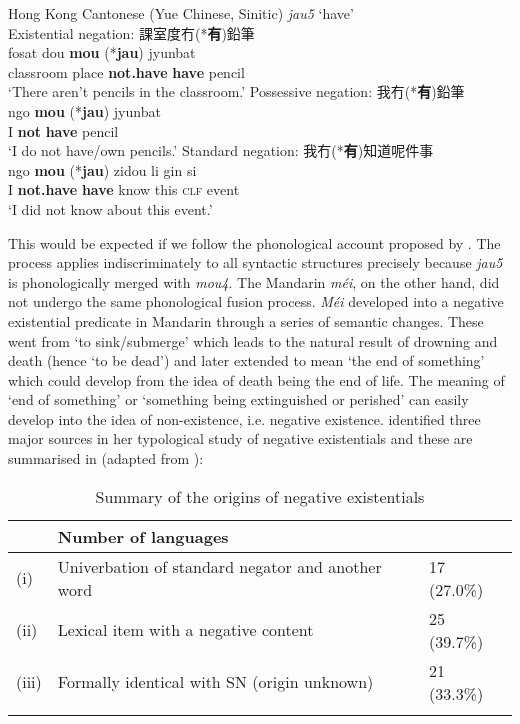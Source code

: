 \documentclass[output=paper,colorlinks,citecolor=brown,chinesefont]{langscibook}
\begin{document}
\newpage
\ea Hong Kong Cantonese (Yue Chinese, Sinitic) \textit{jau5} `have' \label{ex:lam32}\\
  \ea Existential negation: {\cn 課室度冇(*\textbf{有})鉛筆} \label{ex:lam32a}\\
  	\gll fosat dou \textbf{mou} (*\textbf{jau}) jyunbat\\
  	classroom	place	\textbf{not.have}	\textbf{have}	pencil\\
  	\glt `There aren't pencils in the classroom.'
  \ex Possessive negation: {\cn 我冇(*\textbf{有})鉛筆} \label{ex:lam32b}\\
  	\gll ngo	 \textbf{mou}	 (*\textbf{jau}) jyunbat\\
  	I \textbf{not} \textbf{have} pencil\\
  	\glt `I do not have/own pencils.'
  \ex Standard negation: {\cn 我冇(*\textbf{有})知道呢件事} \label{ex:lam32c}\\
  	\gll ngo	 \textbf{mou} (*\textbf{jau}) zidou li gin si\\
  	I \textbf{not.have} \textbf{have} know this	\textsc{clf}	event\\
  	\glt `I did not know about this event.'
\z \z

This would be expected if we follow the phonological account proposed by \citeauthor{Law2014}. The process applies indiscriminately to all syntactic structures precisely because \textit{jau5} is phonologically merged with \textit{mou4}. The Mandarin \textit{méi}, on the other hand, did not undergo the same phonological fusion process. \textit{Méi} developed into a negative existential predicate in Mandarin through a series of semantic changes. These went from `to sink/submerge' which leads to the natural result of drowning and death (hence `to be dead') and later extended to mean `the end of something' which could develop from the idea of death being the end of life. The meaning of `end of something' or `something being extinguished or perished' can easily develop into the idea of non-existence, i.e. negative existence. \citet{Veselinova2013} identified three major sources in her typological study of negative existentials and these are summarised in  (adapted from \citet[Table 7]{Veselinova2013}):

\begin{table}
  \begin{tabularx}{\textwidth}{llY}
    \lsptoprule
     & Number of languages\\
     \midrule
(i)	& Univerbation of standard negator and another word & 17 (27.0\%)\\
(ii) & Lexical item with a negative content & 25 (39.7\%)\\
(iii) & Formally identical with SN (origin unknown) & 21 (33.3\%)\\
\lspbottomrule
\end{tabularx}
  \caption{Summary of the origins of negative existentials}
  \label{tab:lam9}
\end{table}
\end{document}
